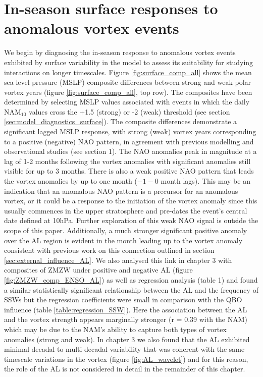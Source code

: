 \section{In-season surface responses to anomalous vortex events}
We begin by diagnosing the in-season response to anomalous vortex events exhibited by surface variability in the model to assess its suitability for studying interactions on longer timescales. Figure \ref{fig:surface_comp_all} shows the mean sea level pressure (MSLP) composite differences between strong and weak polar vortex years (figure \ref{fig:surface_comp_all}, top row). The composites have been determined by selecting MSLP values associated with events in which the daily NAM$_{10}$ values cross the +1.5 (strong) or -2 (weak) threshold (see section \ref{sec:model_diagnostics_surface}). The composite differences demonstrate a significant lagged MSLP response, with strong (weak) vortex years  corresponding to a positive (negative) NAO pattern, in agreement with previous modelling and observational studies (see section 1). The NAO anomalies peak in magnitude at a lag of 1-2 months following the vortex anomalies with significant anomalies still visible for up to 3 months. There is also a weak positive NAO pattern that leads the vortex anomalies by up to one month ($-1 - 0$ month lags). This may be an indication that an anomalous NAO pattern is a precursor for an anomalous vortex, or it could be a response to the initiation of the vortex anomaly since this usually commences in the upper stratosphere and pre-dates the event's central date defined at 10hPa. Further exploration of this weak NAO signal is outside the scope of this paper. Additionally, a much stronger significant positive anomaly over the AL region is evident in the month leading up to the vortex anomaly consistent with previous work on this connection outlined in section \ref{sec:external_influence_AL}. We also analysed this link in chapter 3 with composites of ZMZW under positive and negative AL (figure \ref{fig:ZMZW_comp_ENSO_AL}) as well as regression analysis (table 1) and found a similar statistically significant relationship between the AL and the frequency of SSWs but the regression coefficients were small in comparison with the QBO influence (table \ref{table:regression_SSW}). Here the association between the AL and the vortex strength appears marginally stronger (r = 0.39 with the NAM) which may be due to the NAM's ability to capture both types of vortex anomalies (strong and weak). In chapter 3 we also found that the AL exhibited minimal decadal to multi-decadal variability that was coherent with the same timescale variations in the vortex (figure \ref{fig:AL_wavelet}) and for this reason, the role of the AL is not considered in detail in the remainder of this chapter.

